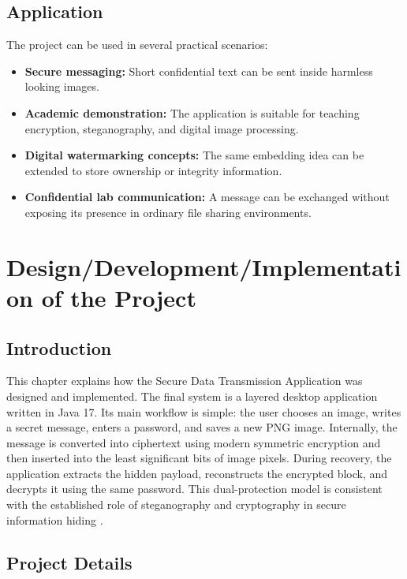 \documentclass[12pt]{report}
\begin{document}
\section{Application}
The project can be used in several practical scenarios:
\begin{itemize}
    \item \textbf{Secure messaging:} Short confidential text can be sent inside harmless looking images.
    \item \textbf{Academic demonstration:} The application is suitable for teaching encryption, steganography, and digital image processing.
    \item \textbf{Digital watermarking concepts:} The same embedding idea can be extended to store ownership or integrity information.
    \item \textbf{Confidential lab communication:} A message can be exchanged without exposing its presence in ordinary file sharing environments.
\end{itemize}

\newpage
\chapter{Design/Development/Implementation of the Project}

\section{Introduction}
This chapter explains how the Secure Data Transmission Application was designed and implemented. The final system is a layered desktop application written in Java 17. Its main workflow is simple: the user chooses an image, writes a secret message, enters a password, and saves a new PNG image. Internally, the message is converted into ciphertext using modern symmetric encryption and then inserted into the least significant bits of image pixels. During recovery, the application extracts the hidden payload, reconstructs the encrypted block, and decrypts it using the same password. This dual-protection model is consistent with the established role of steganography and cryptography in secure information hiding \cite{fridrich2009steganography} \cite{stallings2017cryptography}.

\section{Project Details}
\end{document}
